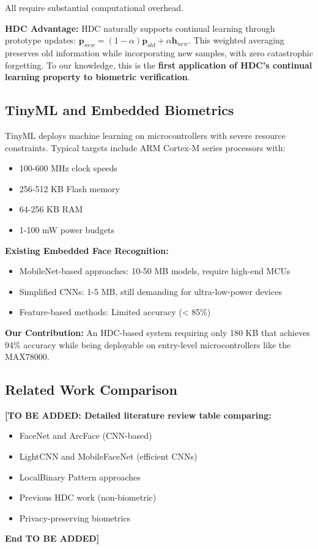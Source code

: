 \documentclass[a4paper,12pt]{article}
\begin{document}
All require substantial computational overhead.

\textbf{HDC Advantage:} HDC naturally supports continual learning through prototype updates: $\mathbf{p}_{new} = (1-\alpha)\mathbf{p}_{old} + \alpha\mathbf{h}_{new}$. This weighted averaging preserves old information while incorporating new samples, with zero catastrophic forgetting. To our knowledge, this is the \textbf{first application of HDC's continual learning property to biometric verification}.

\subsection{TinyML and Embedded Biometrics}

TinyML deploys machine learning on microcontrollers with severe resource constraints. Typical targets include ARM Cortex-M series processors with:
\begin{itemize}
    \item 100-600 MHz clock speeds
    \item 256-512 KB Flash memory
    \item 64-256 KB RAM
    \item 1-100 mW power budgets
\end{itemize}

\textbf{Existing Embedded Face Recognition:}
\begin{itemize}
    \item MobileNet-based approaches: 10-50 MB models, require high-end MCUs
    \item Simplified CNNs: 1-5 MB, still demanding for ultra-low-power devices
    \item Feature-based methods: Limited accuracy (< 85\%)
\end{itemize}

\textbf{Our Contribution:} An HDC-based system requiring only 180 KB that achieves 94\% accuracy while being deployable on entry-level microcontrollers like the MAX78000.

\subsection{Related Work Comparison}

\textbf{[TO BE ADDED: Detailed literature review table comparing:}
\begin{itemize}
    \item FaceNet and ArcFace (CNN-based)
    \item LightCNN and MobileFaceNet (efficient CNNs)
    \item LocalBinary Pattern approaches
    \item Previous HDC work (non-biometric)
    \item Privacy-preserving biometrics
\end{itemize}
\textbf{End TO BE ADDED]}
\end{document}
